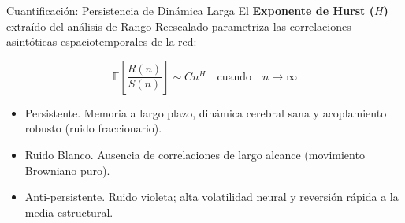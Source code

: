 \documentclass[10pt, aspectratio=169]{beamer} %
\begin{document}
\begin{frame}{Cuantificación: Persistencia de Dinámica Larga}
    El \textbf{Exponente de Hurst ($H$)} extraído del análisis de Rango Reescalado parametriza las correlaciones asintóticas espaciotemporales de la red:
    
    \begin{equation*}
        \mathbb{E} \left[ \frac{R(n)}{S(n)} \right] \sim C n^H \quad \text{cuando} \quad n \to \infty
    \end{equation*}
    
    \vspace{0.4cm}
    \begin{itemize}
        \item {} \alert{Persistente.} Memoria a largo plazo, dinámica cerebral sana y acoplamiento robusto (ruido fraccionario).
        \vspace{0.2cm}
        \item {} \alert{Ruido Blanco.} Ausencia de correlaciones de largo alcance (movimiento Browniano puro).
        \vspace{0.2cm}
        \item {} \alert{Anti-persistente.} Ruido violeta; alta volatilidad neural y reversión rápida a la media estructural.
    \end{itemize}
\end{frame}
\end{document}
